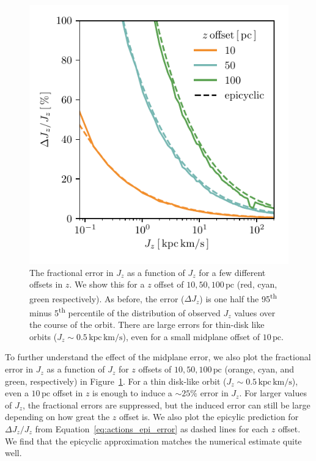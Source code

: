 \documentclass[twocolumn]{aastex62}
\newcommand{\pc}{\text{pc}}
\newcommand{\kms}{\text{km}/\text{s}}
\newcommand{\actunit}{\text{kpc}\,\kms}
\newcommand{\uth}{\textsuperscript{th}}
\begin{document}
\begin{figure}
\begin{center}
\includegraphics[width=\columnwidth]{fig/schmactions_many_orbits_Jz_fun.pdf}
\end{center}
\caption{The fractional error in $J_z$ as a function of $J_z$ for a few
different offsets in $z$. We show this for a $z$ offset of $10, 50, 100\,\pc$
(red, cyan, green respectively). As before, the error ($\Delta J_z$) is one
half the 95\uth{} minus 5\uth{} percentile of the distribution of observed
$J_z$ values over the course of the orbit. There are large errors for
thin-disk like orbits ($J_z \sim 0.5\,\actunit$), even for a small midplane
offset of $10\,\pc$. }
\label{fig:dJz_fun_Jz}
\end{figure}

To further understand the effect of the midplane error, we also plot the
fractional error in $J_z$ as a function of $J_z$ for $z$ offsets of $10, 50,
100\,\pc$ (orange, cyan, and green, respectively) in
Figure~\ref{fig:dJz_fun_Jz}. For a thin disk-like orbit
($J_z\sim0.5\,\actunit$), even a $10\,\pc$ offset in $z$ is enough to induce a
$\sim25\%$ error in $J_z$. For larger values of $J_z$, the fractional errors
are suppressed, but the induced error can still be large depending on how
great the $z$ offset is. We also plot the epicylic prediction for $\Delta J_z
/ J_z$ from Equation~\ref{eq:actions_epi_error} as dashed lines for each $z$
offset. We find that the epicyclic approximation matches the numerical
estimate quite well.
\end{document}
